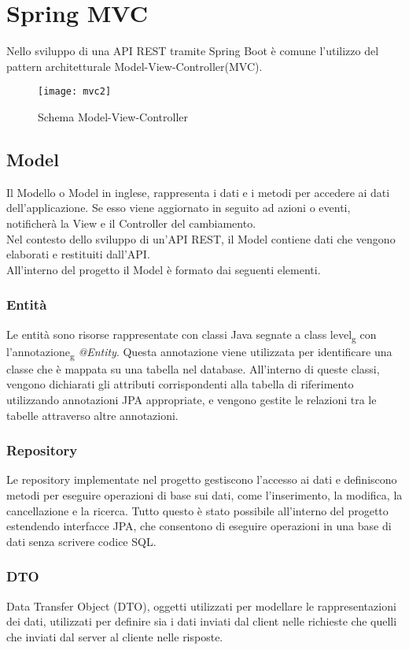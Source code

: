 \section{Spring MVC}
Nello sviluppo di una API REST tramite Spring Boot è comune l'utilizzo del pattern architetturale Model-View-Controller(MVC).\\

\begin{figure}[H] 
    \centering 
    \texttt{[image: mvc2]} 
    \caption{Schema Model-View-Controller}
\end{figure}

\subsection{Model}
Il Modello o Model in inglese, rappresenta i dati e i metodi per accedere ai dati dell'applicazione. Se esso viene aggiornato in seguito ad azioni o eventi, notificherà la View e il Controller del cambiamento.\\
Nel contesto dello sviluppo di un'API REST, il Model contiene dati che vengono elaborati e restituiti dall'API.\\
All'interno del progetto il Model è formato dai seguenti elementi.
\subsubsection*{Entità}
Le entità sono risorse rappresentate con classi Java segnate a class level\textsubscript{g} con l'annotazione\textsubscript{g} \textit{@Entity}. Questa annotazione viene utilizzata per identificare una classe che è mappata su una tabella nel database. All'interno di queste classi, vengono dichiarati gli attributi corrispondenti alla tabella di riferimento utilizzando annotazioni JPA appropriate, e vengono gestite le relazioni tra le tabelle attraverso altre annotazioni.
\subsubsection*{Repository}
Le repository implementate nel progetto gestiscono l'accesso ai dati e definiscono metodi per eseguire operazioni di base sui dati, come l'inserimento, la modifica, la cancellazione e la ricerca. Tutto questo è stato possibile all'interno del progetto estendendo interfacce JPA, che consentono di eseguire operazioni in una base di dati senza scrivere codice SQL.
\subsubsection*{DTO}
Data Transfer Object (DTO), oggetti utilizzati per modellare le rappresentazioni dei dati, utilizzati per definire sia i dati inviati dal client nelle richieste che quelli che inviati dal server al cliente nelle risposte.\\

